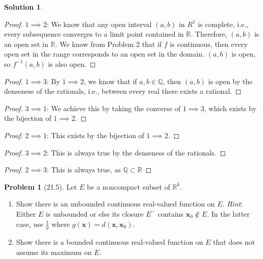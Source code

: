 \documentclass[12pt]{article}
\theoremstyle{definition} %
\newtheorem{solution}{Solution}
\newtheorem{problem}{Problem}
\theoremstyle{plain} %
\begin{document}
\begin{solution}
  \begin{proof}  
    $1\implies 2$: We know that any open interval $(a,b)$ in $R^{1}$ is complete, i.e., every subsequence converges to a limit point contained in $\mathbb{R}$. Therefore, $(a,b)$ is an open set in $\mathbb{R}$. We know from Problem 2 that if $f$ is continuous, then every open set in the range corresponds to an open set in the domain. $(a,b)$ is open, so $f^{-1}(a,b)$ is also open.    
    \end{proof}
\begin{proof}  
$1\implies 3$: By $1\implies 2$, we know that if $a,b\in \mathbb{Q} $, then $(a,b)$ is open by the denseness of the rationals, i.e., between every real there exists a rational.  
\end{proof}
\begin{proof}  
$3\implies 1$: We achieve this by taking the converse of $1\implies 3$, which exists by the bijection of $1\implies 2$.
\end{proof}

\begin{proof}  
$2\implies 1$: This exists by the bijection of $1\implies 2$.  
\end{proof}
\begin{proof}  
$3\implies 2$: This is always true by the denseness of the rationals.
\end{proof}
\begin{proof}  
$2\implies 3$: This is always true, as $\mathbb{Q} \subset \mathbb{R}$ 
\end{proof}
\end{solution}
\begin{problem}[21.5]
  Let $E$ be a noncompact subset of $\mathbb{R}^{k}$.
  \begin{enumerate}
    \item Show there is an unbounded continuous real-valued function on $E$. \emph{Hint}: Either $E$ is unbounded or else its closure $E^{-}$ contains $\mathbf{x}_{0} \notin E$. In the latter case, use $\frac{1}{g}$ where $g(\mathbf{x}) =d(\mathbf{x},\mathbf{x}_{0})$.
    \item Show there is a bounded continuous real-valued function on $E$ that does not assume its maximum on $E$.
  \end{enumerate}
\end{problem}
\end{document}

